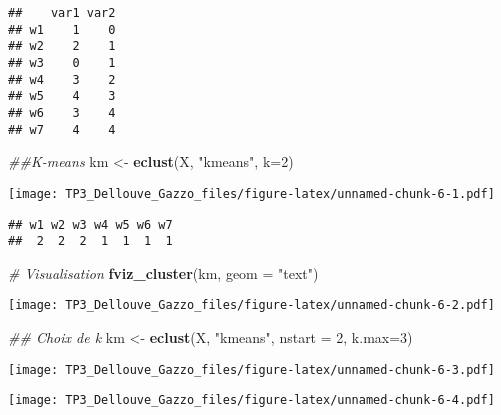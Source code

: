 \documentclass[
]{article}
\newenvironment{Shaded}{\begin{snugshade}}{\end{snugshade}}
\newcommand{\CommentTok}[1]{\textcolor[rgb]{0.56,0.35,0.01}{\textit{#1}}}
\newcommand{\DataTypeTok}[1]{\textcolor[rgb]{0.13,0.29,0.53}{#1}}
\newcommand{\DecValTok}[1]{\textcolor[rgb]{0.00,0.00,0.81}{#1}}
\newcommand{\KeywordTok}[1]{\textcolor[rgb]{0.13,0.29,0.53}{\textbf{#1}}}
\newcommand{\NormalTok}[1]{#1}
\newcommand{\OperatorTok}[1]{\textcolor[rgb]{0.81,0.36,0.00}{\textbf{#1}}}
\newcommand{\StringTok}[1]{\textcolor[rgb]{0.31,0.60,0.02}{#1}}
\begin{document}
\begin{verbatim}
##    var1 var2
## w1    1    0
## w2    2    1
## w3    0    1
## w4    3    2
## w5    4    3
## w6    3    4
## w7    4    4
\end{verbatim}

\begin{Shaded}
\begin{Highlighting}[]
\CommentTok{##K-means}
\NormalTok{km <-}\StringTok{ }\KeywordTok{eclust}\NormalTok{(X, }\StringTok{"kmeans"}\NormalTok{, }\DataTypeTok{k=}\DecValTok{2}\NormalTok{)}
\end{Highlighting}
\end{Shaded}

\texttt{[image: TP3\_Dellouve\_Gazzo\_files/figure-latex/unnamed-chunk-6-1.pdf]}

\begin{Shaded}
\end{Shaded}

\begin{verbatim}
## w1 w2 w3 w4 w5 w6 w7 
##  2  2  2  1  1  1  1
\end{verbatim}

\begin{Shaded}
\begin{Highlighting}[]
\CommentTok{# Visualisation}
\KeywordTok{fviz_cluster}\NormalTok{(km, }\DataTypeTok{geom =} \StringTok{"text"}\NormalTok{)}
\end{Highlighting}
\end{Shaded}

\texttt{[image: TP3\_Dellouve\_Gazzo\_files/figure-latex/unnamed-chunk-6-2.pdf]}

\begin{Shaded}
\begin{Highlighting}[]
\CommentTok{## Choix de k}
\NormalTok{km <-}\StringTok{ }\KeywordTok{eclust}\NormalTok{(X, }\StringTok{"kmeans"}\NormalTok{, }\DataTypeTok{nstart =} \DecValTok{2}\NormalTok{, }\DataTypeTok{k.max=}\DecValTok{3}\NormalTok{)}
\end{Highlighting}
\end{Shaded}

\texttt{[image: TP3\_Dellouve\_Gazzo\_files/figure-latex/unnamed-chunk-6-3.pdf]}

\begin{Shaded}
\end{Shaded}

\texttt{[image: TP3\_Dellouve\_Gazzo\_files/figure-latex/unnamed-chunk-6-4.pdf]}
\end{document}
